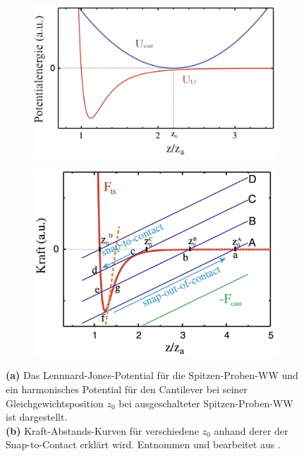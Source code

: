     \begin{figure}
        \centering
        \begin{subfigure}{0.49\textwidth}
            \includegraphics[width = \textwidth]{bilder/Snap_to_Contact_Potential.png}
            \caption{}
            \label{fig:Snap_to_Contact_Potential}
        \end{subfigure}
        \hfill
        \begin{subfigure}{0.49\textwidth}
            \includegraphics[width = \textwidth]{bilder/Snap_to_Contact_Kraft.png}
            \caption{}
            \label{fig:Snap_to_Contact_Kraft}
        \end{subfigure}
        \caption{\textbf{(a)} Das Lennnard-Jones-Potential für die Spitzen-Proben-WW und ein harmonisches Potential für den Cantilever bei seiner Gleichgewichtsposition $z_0$ bei ausgeschalteter Spitzen-Proben-WW ist dargestellt. \\ \textbf{(b)} Kraft-Abstands-Kurven für verschiedene $z_0$ anhand derer der Snap-to-Contact erklärt wird. Entnommen und bearbeitet aus \cite{voigtlaender}.}
        \label{fig:Snap_to_Contact}
    \end{figure}
